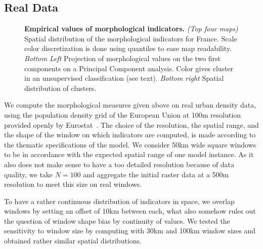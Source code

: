 \documentclass[10pt,letterpaper]{article}
\begin{document}
\subsection*{Real Data}



\begin{figure}[!h]
\caption{\textbf{Empirical values of morphological indicators.} \textit{(Top four maps)} Spatial distribution of the morphological indicators for France. Scale color discretization is done using quantiles to ease map readability. \textit{Bottom Left} Projection of morphological values on the two first components on a Principal Component analysis. Color gives  cluster in an unsupervised classification (see text). \textit{Bottom right} Spatial distribution of clusters.}
\label{fig:empirical}
\end{figure}



We compute the morphological measures given above on real urban density data, using the population density grid of the European Union at 100m resolution provided openly by Eurostat~\cite{eurostat}. The choice of the resolution, the spatial range, and the shape of the window on which indicators are computed, is made according to the thematic specifications of the model. We consider 50km wide square windows to be in accordance with the expected spatial range of one model instance. As it also does not make sense to have a too detailed resolution because of data quality, we take $N=100$ and aggregate the initial raster data at a 500m resolution to meet this size on real windows. 


To have a rather continuous distribution of indicators in space, we overlap windows by setting an offset of 10km between each, what also somehow rules out the question of window shape bias by  continuity of values. We tested the sensitivity to window size by computing  with 30km and 100km window sizes and obtained rather similar spatial distributions.
\end{document}

